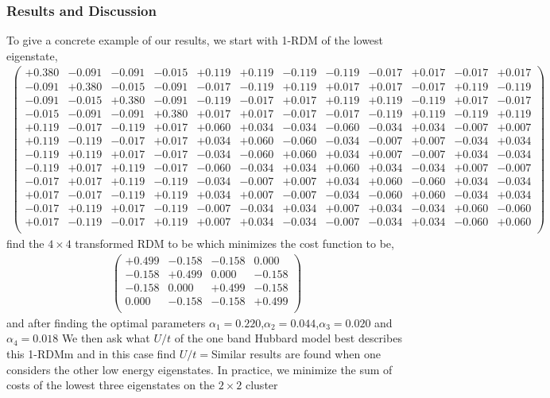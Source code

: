 \documentclass[prl,12pt,onecolumn,nofootinbib,notitlepage,english,superscriptaddress]{revtex4-1}
\begin{document}
\subsubsection{Results and Discussion}
To give a concrete example of our results, we start with 1-RDM of the lowest eigenstate, 
\begin{eqnarray}
\left(
\begin{array}{cccccccccccc}
+0.380	   & -0.091 &-0.091 &-0.015& +0.119& +0.119& -0.119 &-0.119 &-0.017 &+0.017 &-0.017 &+0.017 \\
-0.091	   & +0.380 &-0.015 &-0.091& -0.017& -0.119& +0.119 &+0.017 &+0.017 &-0.017 &+0.119 &-0.119 \\
-0.091	   & -0.015 &+0.380 &-0.091& -0.119& -0.017& +0.017 &+0.119 &+0.119 &-0.119 &+0.017 &-0.017 \\
-0.015	   & -0.091 &-0.091 &+0.380& +0.017& +0.017& -0.017 &-0.017 &-0.119 &+0.119 &-0.119 &+0.119 \\
+0.119	   & -0.017 &-0.119 &+0.017& +0.060& +0.034& -0.034 &-0.060 &-0.034 &+0.034 &-0.007 &+0.007 \\
+0.119	   & -0.119 &-0.017 &+0.017& +0.034& +0.060& -0.060 &-0.034 &-0.007 &+0.007 &-0.034 &+0.034 \\
-0.119	   & +0.119 &+0.017 &-0.017& -0.034& -0.060& +0.060 &+0.034 &+0.007 &-0.007 &+0.034 &-0.034 \\
-0.119	   & +0.017 &+0.119 &-0.017& -0.060& -0.034& +0.034 &+0.060 &+0.034 &-0.034 &+0.007 &-0.007 \\
-0.017	   & +0.017 &+0.119 &-0.119& -0.034& -0.007& +0.007 &+0.034 &+0.060 &-0.060 &+0.034 &-0.034 \\
+0.017	   & -0.017 &-0.119 &+0.119& +0.034& +0.007& -0.007 &-0.034 &-0.060 &+0.060 &-0.034 &+0.034 \\
-0.017	   & +0.119 &+0.017 &-0.119& -0.007& -0.034& +0.034 &+0.007 &+0.034 &-0.034 &+0.060 &-0.060 \\
+0.017	   & -0.119 &-0.017 &+0.119& +0.007& +0.034& -0.034 &-0.007 &-0.034 &+0.034 &-0.060 &+0.060 \\
\end{array}
\right)
\end{eqnarray}
find the $4\times4$ transformed RDM to be which minimizes the cost function to be, 
\begin{eqnarray}
\left(
\begin{array}{cccc}
+0.499 & -0.158 & -0.158 & 0.000  \\
-0.158 & +0.499 &  0.000 & -0.158 \\
-0.158 &  0.000 & +0.499 & -0.158 \\
 0.000 & -0.158 & -0.158 & +0.499 \\
\end{array}
\right)
\end{eqnarray}
and after finding the optimal parameters $\alpha_1=0.220$,$\alpha_2=0.044$,$\alpha_3=0.020$ and $\alpha_4=0.018$ 
We then ask what $U/t$ of the one band Hubbard model best describes this 1-RDMm and in this case find $U/t = $Similar results are found when 
one considers the other low energy eigenstates. In practice, we minimize the sum of costs of the lowest 
three eigenstates on the $2 \times 2$ cluster  
 
\end{document}
